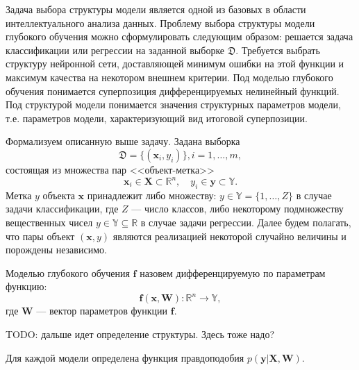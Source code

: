 \newpage{}
Задача выбора структуры модели является одной из базовых в области интеллектуального анализа данных.
Проблему выбора структуры модели глубокого обучения можно сформулировать следующим образом: решается задача классификации или регрессии на заданной выборке $\mathfrak{D}$. Требуется выбрать структуру нейронной сети, доставляющей минимум ошибки на этой функции и максимум качества на некотором внешнем критерии.
 Под моделью глубокого обучения понимается суперпозиция дифференцируемых нелинейный функций. Под структурой модели понимается значения структурных параметров модели, т.е. параметров модели, характеризующий вид итоговой суперпозиции. 

Формализуем описанную выше задачу.
Задана выборка \begin{equation}\label{eq:dataset}\mathfrak{D} = \{(\mathbf{x}_i,y_i)\}, i = 1,\dots,m,\end{equation} состоящая из множества пар <<объект-метка>> $$\mathbf{x}_i \in \mathbf{X} \subset \mathbb{R}^n, \quad {y}_i \in \mathbf{y} \subset \mathbb{Y}.$$ Метка ${y}$  объекта $\mathbf{x}$ принадлежит либо множеству: ${y} \in \mathbb{Y} = \{1, \dots, Z\}$ в случае задачи классификации, где $Z$ --- число классов, либо некоторому подмножеству вещественных чисел ${y} \in \mathbb{Y}  \subseteq \mathbb{R}$ в случае задачи регрессии. Далее будем полагать, что пары объект $(\mathbf{x}, y)$ являются реализацией некоторой случайно величины и порождены независимо.


\begin{defin}
Моделью глубокого обучения $\mathbf{f}$ назовем дифференцируемую по параметрам функцию:
\[
    \mathbf{f}(\mathbf{x}, \mathbf{W}): \mathbb{R}^n \to \mathbb{Y},
\]
где $\mathbf{W}$ --- вектор параметров функции $\mathbf{f}$.
\end{defin}

TODO: дальше идет определение структуры. Здесь тоже надо?

Для каждой модели определена функция правдоподобия  $p(\mathbf{y}|\mathbf{X}, \mathbf{W})$.
 

